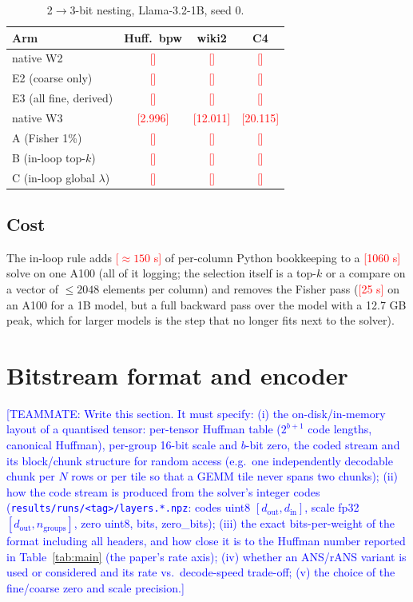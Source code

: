 \documentclass{article}
\newcommand{\tbd}[1]{\textcolor{red}{[#1]}}
\newcommand{\teammate}[1]{\textcolor{blue}{[TEAMMATE: #1]}}
\newcommand{\blank}{\textcolor{red}{[\;\;]}}
\begin{document}
\begin{table}[t]
\caption{2$\to$3-bit nesting, Llama-3.2-1B, seed 0.}
\label{tab:2to3}
\vskip 0.1in
\centering
\footnotesize
\begin{tabular}{lccc}
\toprule
Arm & Huff.\ bpw & wiki2 & C4 \\
\midrule
native W2 & \blank & \blank & \blank \\
E2 (coarse only) & \blank & \blank & \blank \\
E3 (all fine, derived) & \blank & \blank & \blank \\
native W3 & \tbd{2.996} & \tbd{12.011} & \tbd{20.115} \\
A (Fisher 1\%) & \blank & \blank & \blank \\
B (in-loop top-$k$) & \blank & \blank & \blank \\
C (in-loop global $\lambda$) & \blank & \blank & \blank \\
\bottomrule
\end{tabular}
\end{table}

\subsection{Cost}
\label{sec:cost}

The in-loop rule adds \tbd{$\approx 150$ s} of per-column Python
bookkeeping to a \tbd{1060 s} solve on one A100 (all of it logging; the
selection itself is a top-$k$ or a compare on a vector of $\le 2048$
elements per column) and removes the Fisher pass (\tbd{25 s} on an A100
for a 1B model, but a full backward pass over the model with a 12.7 GB
peak, which for larger models is the step that no longer fits next to
the solver).



\section{Bitstream format and encoder}
\label{sec:bitstream}

\teammate{Write this section. It must specify: (i) the on-disk/in-memory
layout of a quantised tensor: per-tensor Huffman table ($2^{b+1}$ code
lengths, canonical Huffman), per-group 16-bit scale and $b$-bit zero, the
coded stream and its block/chunk structure for random access (e.g.\ one
independently decodable chunk per $N$ rows or per tile so that a GEMM
tile never spans two chunks); (ii) how the code stream is produced from
the solver's integer codes (\texttt{results/runs/<tag>/layers.*.npz}:
codes uint8 $[d_{\mathrm{out}}, d_{\mathrm{in}}]$, scale fp32
$[d_{\mathrm{out}}, n_{\mathrm{groups}}]$, zero uint8, bits, zero\_bits);
(iii) the exact bits-per-weight of the format including all headers, and
how close it is to the Huffman number reported in Table~\ref{tab:main}
(the paper's rate axis); (iv) whether an ANS/rANS variant is used or
considered and its rate vs.\ decode-speed trade-off; (v) the choice of
the fine/coarse zero and scale precision.}
\end{document}
